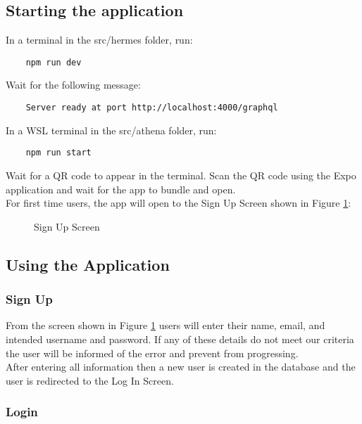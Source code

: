 \documentclass{article}
\begin{document}
\subsection{Starting the application}

In a terminal in the src/hermes folder, run:
    \begin{verbatim}
    npm run dev
    \end{verbatim}

Wait for the following message:
    \begin{verbatim}
    Server ready at port http://localhost:4000/graphql
    \end{verbatim}

In a WSL terminal in the src/athena folder, run:
    \begin{verbatim}
    npm run start
    \end{verbatim}

Wait for a QR code to appear in the terminal. Scan the QR code using the Expo application and wait for the app to bundle and open.\\
For first time users, the app will open to the Sign Up Screen shown in Figure \ref{Fig1}:
\begin{figure}[H]
    \centering
    \caption{Sign Up Screen}
    \label{Fig1}
    \end{figure}


\subsection{Using the Application}

\subsubsection{Sign Up}

From the screen shown in Figure \ref{Fig1} users will enter their name, email, and intended username and password. If any of these details do not meet our criteria the user will be informed of the error and prevent from progressing.\\
After entering all information then a new user is created in the database and the user is redirected to the Log In Screen.

\subsubsection{Login}
\end{document}
